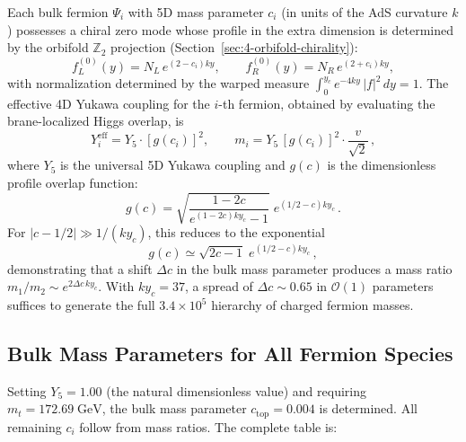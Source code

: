 Each bulk fermion $\Psi_i$ with 5D mass parameter $c_i$ (in units of the AdS curvature $k$) possesses a chiral zero mode whose profile in the extra dimension is determined by the orbifold $\mathbb{Z}_2$ projection (Section~\ref{sec:4-orbifold-chirality}):
\begin{equation}
  f_L^{(0)}(y) = N_L\, e^{(2-c_i)ky}, \qquad
  f_R^{(0)}(y) = N_R\, e^{(2+c_i)ky},
  \label{eq:4-74}
\end{equation}
with normalization determined by the warped measure $\int_0^{y_c} e^{-4ky}\, |f|^2\, dy = 1$. The effective 4D Yukawa coupling for the $i$-th fermion, obtained by evaluating the brane-localized Higgs overlap, is
\begin{equation}
  Y_i^{\mathrm{eff}} = Y_5 \cdot [g(c_i)]^2, \qquad
  m_i = Y_5\, [g(c_i)]^2 \cdot \frac{v}{\sqrt{2}}\,,
  \label{eq:4-75}
\end{equation}
where $Y_5$ is the universal 5D Yukawa coupling and $g(c)$ is the dimensionless profile overlap function:
\begin{equation}
  g(c) = \sqrt{\frac{1 - 2c}{e^{(1-2c)ky_c} - 1}}\; e^{(1/2 - c)ky_c}\,.
  \label{eq:4-76}
\end{equation}
For $|c - 1/2| \gg 1/(ky_c)$, this reduces to the exponential
\begin{equation}
  g(c) \simeq \sqrt{2c - 1}\; e^{(1/2 - c)ky_c}\,,
  \label{eq:4-77}
\end{equation}
demonstrating that a shift $\Delta c$ in the bulk mass parameter produces a mass ratio $m_1/m_2 \sim e^{2\Delta c\, ky_c}$. With $ky_c = 37$, a spread of $\Delta c \sim 0.65$ in $\mathcal{O}(1)$ parameters suffices to generate the full $3.4 \times 10^5$ hierarchy of charged fermion masses.

\subsection{Bulk Mass Parameters for All Fermion Species}
\label{sec:4-ci-table}

Setting $Y_5 = 1.00$ (the natural dimensionless value) and requiring $m_t = 172.69\;\mathrm{GeV}$, the bulk mass parameter $c_{\mathrm{top}} = 0.004$ is determined. All remaining $c_i$ follow from mass ratios. The complete table is:

